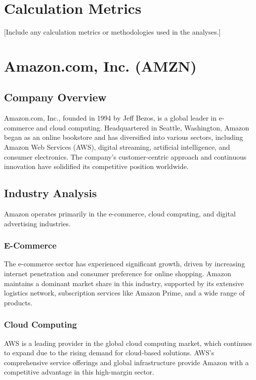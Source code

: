 \documentclass[12pt]{report}
\begin{document}
\chapter{Calculation Metrics}
[Include any calculation metrics or methodologies used in the analyses.]

\chapter{Amazon.com, Inc. (AMZN)}

\section{Company Overview}
Amazon.com, Inc., founded in 1994 by Jeff Bezos, is a global leader in e-commerce and cloud computing. Headquartered in Seattle, Washington, Amazon began as an online bookstore and has diversified into various sectors, including Amazon Web Services (AWS), digital streaming, artificial intelligence, and consumer electronics. The company's customer-centric approach and continuous innovation have solidified its competitive position worldwide.

\section{Industry Analysis}
Amazon operates primarily in the e-commerce, cloud computing, and digital advertising industries.

\subsection{E-Commerce}
The e-commerce sector has experienced significant growth, driven by increasing internet penetration and consumer preference for online shopping. Amazon maintains a dominant market share in this industry, supported by its extensive logistics network, subscription services like Amazon Prime, and a wide range of products.

\subsection{Cloud Computing}
AWS is a leading provider in the global cloud computing market, which continues to expand due to the rising demand for cloud-based solutions. AWS's comprehensive service offerings and global infrastructure provide Amazon with a competitive advantage in this high-margin sector.
\end{document}
